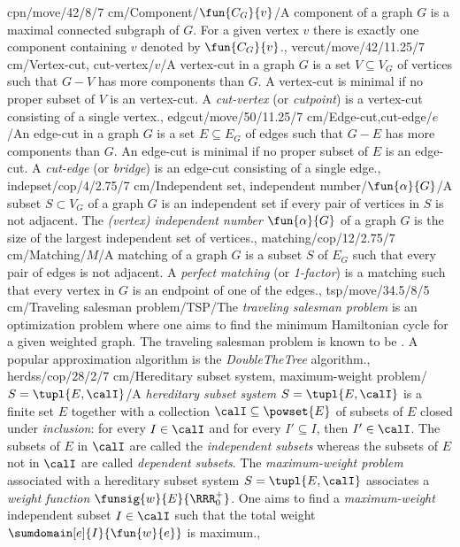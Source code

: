 cpn/move/42/8/7 cm/{Component}/{$\fun{C_G}{v}$}/{A component of a graph $G$ is a maximal connected subgraph of $G$. For a given vertex $v$ there is exactly one component containing $v$ denoted by $\fun{C_G}{v}$.},
vercut/move/42/11.25/7 cm/{Vertex-cut, cut-vertex}/{\Rightscissors$v$}/{A vertex-cut in a graph $G$ is a set $V\subseteq V_G$ of vertices such that $G-V$ has more components than $G$. A vertex-cut is minimal if no proper subset of $V$ is an vertex-cut. A \emph{cut-vertex} (or \emph{cutpoint}) is a vertex-cut consisting of a single vertex.},
edgcut/move/50/11.25/7 cm/{Edge-cut,cut-edge}/{\Rightscissors$e$}/{An edge-cut in a graph $G$ is a set $E\subseteq E_G$ of edges such that $G-E$ has more components than $G$. An edge-cut is minimal if no proper subset of $E$ is an edge-cut. A \emph{cut-edge} (or \emph{bridge}) is an edge-cut consisting of a single edge.},
indepset/cop/4/2.75/7 cm/{Independent set, independent number}/{$\fun{\alpha}{G}$}/{A subset $S\subset V_G$ of a graph $G$ is an independent set if every pair of vertices in $S$ is not adjacent. The \emph{(vertex) independent number} $\fun{\alpha}{G}$ of a graph $G$ is the size of the largest independent set of vertices.},
matching/cop/12/2.75/7 cm/{Matching}/{$M$}/{A matching of a graph $G$ is a subset $S$ of $E_G$ such that every pair of edges is not adjacent. A \emph{perfect matching} (or \emph{1-factor}) is a matching such that every vertex in $G$ is an endpoint of one of the edges.},
tsp/move/34.5/8/5 cm/{Traveling salesman problem}/{TSP}/{The \emph{traveling salesman problem} is an optimization problem where one aims to find the minimum Hamiltonian cycle for a given weighted graph. The traveling salesman problem is known to be \ccnph{}. A popular approximation algorithm is the \emph{DoubleTheTree} algorithm.},
herdss/cop/28/2/7 cm/{Hereditary subset system, maximum-weight problem}/{$S=\tupl{E,\calI}$}/{A \emph{hereditary subset system} $S=\tupl{E,\calI}$ is a finite set $E$ together with a collection $\calI\subseteq\powset{E}$ of subsets of $E$ closed under \emph{inclusion}: for every $I\in\calI$ and for every $I'\subseteq I$, then $I'\in\calI$. The subsets of $E$ in $\calI$ are called the \emph{independent subsets} whereas the subsets of $E$ not in $\calI$ are called \emph{dependent subsets}. The \emph{maximum-weight problem} associated with a hereditary subset system $S=\tupl{E,\calI}$ associates a \emph{weight function} $\funsig{w}{E}{\RRR^+_0}$. One aims to find a \emph{maximum-weight} independent subset $I\in\calI$ such that the total weight $\sumdomain[e]{I}{\fun{w}{e}}$ is maximum.},
